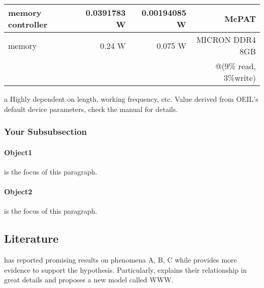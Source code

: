 \documentclass[../template.tex]{subfiles}
\begin{document}
\begin{table}[!htb]
\begin{adjustbox}{max width=\textwidth}
\begin{threeparttable}
\begin{tabular}{l r r r}
				memory controller                     & 0.0391783 W               & 0.00194085 W                    & McPAT                          \\ \midrule
				memory                                & 0.24 W                    & 0.075 W                         & MICRON DDR4 8GB                \\
				&                           &                                 & @(9\% read, 3\%write)          \\ \bottomrule
			\end{tabular}
			\begin{tablenotes}
				\newcommand{\CORNERSTONE}{\href{run:./appendix/CORNERSTONE-Standard-Components-Library-SOI.pdf}{CORNERSTONE}}
				\scriptsize
				\item [a] Highly dependent on length, working frequency, etc. Value derived from OEIL's default device parameters, check the manual for details.
			\end{tablenotes}
		\end{threeparttable}
	\end{adjustbox}
\end{table}

\subsubsection{Your Subsubsection}

\paragraph{Object1} is the focus of this paragraph. \blindtext

\paragraph{Object2} is the focus of this paragraph. \blindtext

\subsection{Literature}

\cite{Boney96, MG, HK, Pan, Something} has reported promising results on phenomena A, B, C while \cite{Something} provides more evidence to support the hypothesis. Particularly, \citep[Sec.~III]{Something} explains their relationship in great details and proposes a new model called WWW.
\end{document}
